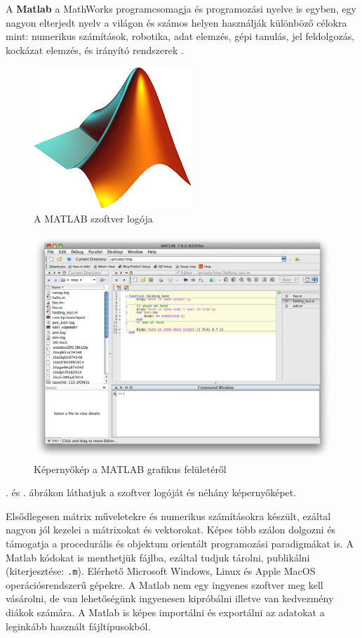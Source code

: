 A \textbf{Matlab} a MathWorks programcsomagja és programozási nyelve is
egyben, egy nagyon elterjedt nyelv a világon és számos helyen használják
különböző célokra mint: numerikus számítások, robotika, adat elemzés,
gépi tanulás, jel feldolgozás, kockázat elemzés, és irányító rendszerek \cite{matlab}.

\begin{figure}[h!]
\centering
\includegraphics{img/Matlab_Logo.png}
\caption{A MATLAB szoftver logója}
\label{fig:matlab-logo}
\end{figure}

\begin{figure}[h!]
\centering
\includegraphics[width=\textwidth]{img/matlab_screenshots.png}
\caption[Matlab]{Képernyőkép a MATLAB grafikus felületéről\footnotemark}
\label{fig:matlab-screenshots}
\end{figure}

. és . ábrákon láthatjuk a szoftver logóját és néhány képernyőképet.

Elsődlegesen mátrix műveletekre és numerikus számításokra készült,
ezáltal nagyon jól kezelei a mátrixokat és vektorokat.
Képes több szálon dolgozni és
támogatja a procedurális és objektum orientált programozási paradigmákat
is. A Matlab kódokat is menthetjük fájlba, ezáltal tudjuk tárolni,
publikálni (kiterjesztése: \texttt{.m}). Elérhető Microsoft Windows, Linux és
Apple MacOS operációsrendszerű gépekre. A Matlab nem egy ingyenes
szoftver meg kell vásárolni, de van lehetőségünk ingyenesen kipróbálni
illetve van kedvezmény diákok számára. A Matlab is képes importálni és
exportálni az adatokat a leginkább használt fájltípusokból.

